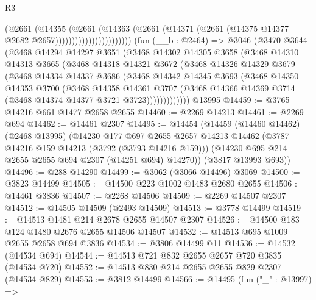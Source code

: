 \begin{lexlean}{R3}
\begin{coremodule}
                                  (@2661
                                    (@14355
                                      (@2661
                                        (@14363
                                          (@2661
                                            (@14371
                                              (@2661
                                                (@14375 @14377 @2682 @2657)))))))))))))))))))))))
    (fun (__b : @2464) =>
    @3046
      (@3470
        @3644
        (@3468
          @14294
          @14297
          @3651
          (@3468
            @14302
            @14305
            @3658
            (@3468
              @14310
              @14313
              @3665
              (@3468
                @14318
                @14321
                @3672
                (@3468
                  @14326
                  @14329
                  @3679
                  (@3468
                    @14334
                    @14337
                    @3686
                    (@3468
                      @14342
                      @14345
                      @3693
                      (@3468
                        @14350
                        @14353
                        @3700
                        (@3468
                          @14358
                          @14361
                          @3707
                          (@3468 @14366 @14369 @3714 (@3468 @14374 @14377 @3721 @3723)))))))))))))
    @13995
@14459 := @3765 @14216 @661 @1477 @2658 @2655
@14460 := @2269 @14213
@14461 := @2269 @694
@14462 := @14461 @2307
@14495 := @14454
    (@14459
      (@14460 @14462)
      (@2468 @13995)
      (@14230
        @177
        @697
        @2655
        @2657
        @14213
        @14462
        (@3787 @14216 @159 @14213 (@3792 (@3793 @14216 @159)))
        (@14230 @695 @214 @2655 @2655 @694 @2307 (@14251 @694) @14270))
      (@3817 @13993 @693))
@14496 := @288 @14290
@14499 := @3062 (@3066 @14496) @3069
@14500 := @3823 @14499
@14505 := @14500 @223 @1002 @1483 @2680 @2655
@14506 := @14461 @3836
@14507 := @2268 @14506
@14509 := @2269 @14507 @2307
@14512 := @14505 @14509 (@2493 @14509)
@14513 := @3778 @14499
@14519 := @14513 @1481 @214 @2678 @2655 @14507 @2307
@14526 := @14500 @183 @124 @1480 @2676 @2655 @14506 @14507
@14532 := @14513 @695 @1009 @2655 @2658 @694 @3836
@14534 := @3806 @14499 @11
@14536 := @14532 (@14534 @694)
@14544 := @14513 @721 @832 @2655 @2657 @720 @3835 (@14534 @720)
@14552 := @14513 @830 @214 @2655 @2655 @829 @2307 (@14534 @829)
@14553 := @3812 @14499
@14566 := @14495
    (fun ("_" : @13997) =>

\end{coremodule}
\end{lexlean}
